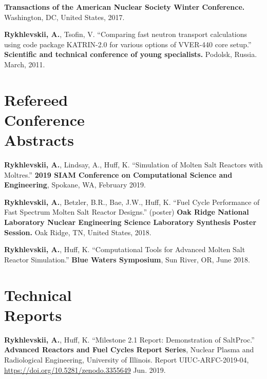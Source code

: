 \documentclass[margin,line]{resume}
\begin{document}
\begin{resume}
\begin{bibenum}
            \textbf{Transactions of the American Nuclear Society Winter Conference.} 
            Washington, DC, United States, 2017.
      \item \textbf{Rykhlevskii, A.}, Tsofin, V. ``Comparing fast neutron transport calculations using code package KATRIN-2.0 for various options of VVER-440 core setup.''
         \textbf{Scientific and technical conference of young specialists.}
         Podolsk, Russia. March, 2011.
	\end{bibenum}
    \section{\mysidestyle Refereed\\Conference\\Abstracts}
    \begin{bibenum} 
    \item \textbf{Rykhlevskii, A.}, Lindsay, A., Huff, K. ``Simulation of Molten Salt Reactors with Moltres.'' \textbf{2019 SIAM Conference on Computational Science and Engineering}, 
            Spokane, WA, February 2019.
	\item \textbf{Rykhlevskii, A.}, Betzler, B.R., Bae, J.W., Huff, K. ``Fuel Cycle Performance of Fast Spectrum Molten Salt Reactor Designs.'' (poster)
            \textbf{Oak Ridge National Laboratory Nuclear Engineering Science Laboratory Synthesis Poster Session.} 
            Oak Ridge, TN, United States, 2018.
    \item \textbf{Rykhlevskii, A.}, Huff, K. ``Computational Tools for Advanced 
            Molten Salt Reactor Simulation.'' \textbf{Blue Waters Symposium}, 
            Sun River, OR, June 2018.
	\end{bibenum}
\section{\mysidestyle Technical\\Reports}
\begin{bibenum} 
	\item \textbf{Rykhlevskii, A.}, Huff, K. ``Milestone 2.1 Report: 
	Demonstration of 
	SaltProc.'' \textbf{Advanced Reactors and Fuel Cycles Report Series}, 
	Nuclear Plasma and Radiological Engineering, University of Illinois.  
	Report UIUC-ARFC-2019-04, \url{https://doi.org/10.5281/zenodo.3355649}  
	Jun. 2019.  
\end{bibenum}

\end{resume}
\end{document}
